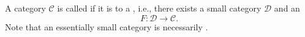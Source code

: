 \begin{definition} \label{definition:essentially_small_category}
A category $\mathcal{C}$ is called  if it is  to a , i.e., there exists a small category $\mathcal{D}$ and an 
$$F : \mathcal{D} \to \mathcal{C}.$$
Note that an essentially small category is necessarily .
\end{definition}